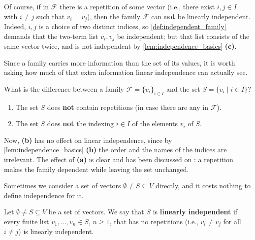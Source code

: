 \begin{remark}
\label{rem:family_repetition_dependent}
Of course, if in $\mathcal{F}$ there is a repetition of some vector (i.e., there exist $i, j \in I$ with $i \ne j$ such that $v_i = v_j$), then the family $\mathcal{F}$ can \textbf{not} be linearly independent. Indeed, $i, j$ is a choice of two distinct indices, so \cref{def:independent_family} demands that the two-term list $v_i, v_j$ be independent; but that list consists of the same vector twice, and is not independent by \cref{lem:independence_basics} \textbf{(c)}.
\end{remark}

Since a family carries more information than the set of its values, it is worth asking how much of that extra information linear independence can actually see.

\begin{question}
\label{q:family_vs_set}
What is the difference between a family $\mathcal{F} = \{v_i\}_{i \in I}$ and the set $S = \{v_i \mid i \in I\}$?
\end{question}

\begin{answer}
\begin{enumerate}[label=\textbf{(\alph*)}]
    \item The set $S$ does \textbf{not} contain repetitions (in case there are any in $\mathcal{F}$).
    \item The set $S$ does \textbf{not}  the indexing $i \in I$ of the elements $v_i$ of $S$.
\end{enumerate}
Now, \textbf{(b)} has no effect on linear independence, since by \cref{lem:independence_basics} \textbf{(b)} the order and the names of the indices are irrelevant. The effect of \textbf{(a)} is clear and has been discussed on : a repetition makes the family dependent while leaving the set unchanged.
\end{answer}

Sometimes we consider a set of vectors $\emptyset \ne S \subseteq V$ directly, and it costs nothing to define independence for it.

\begin{definition}
\label{def:independent_set}
Let $\emptyset \ne S \subseteq V$ be a set of vectors. We say that $S$ is \textbf{linearly independent} if every finite list $v_1, \dots, v_n \in S$, $n \ge 1$, that has no repetitions (i.e., $v_i \ne v_j$ for all $i \ne j$) is linearly independent.
\end{definition}

